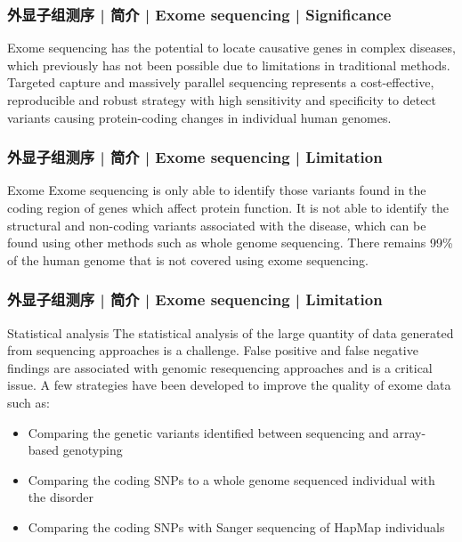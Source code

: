 \begin{frame}
  \frametitle{外显子组测序 | 简介 | Exome sequencing | Significance}
  Exome sequencing has the potential to locate causative genes in complex diseases, which previously has not been possible due to limitations in traditional methods.\\
  \vspace{1em}
  Targeted capture and massively parallel sequencing represents a cost-effective, reproducible and robust strategy with high sensitivity and specificity to detect variants causing protein-coding changes in individual human genomes.
\end{frame}

\begin{frame}
  \frametitle{外显子组测序 | 简介 | Exome sequencing | Limitation}
  \begin{block}{Exome}
 Exome sequencing is only able to identify those variants found in the coding region of genes which affect protein function. It is not able to identify the structural and non-coding variants associated with the disease, which can be found using other methods such as whole genome sequencing. There remains 99\% of the human genome that is not covered using exome sequencing.
  \end{block}
\end{frame}

\begin{frame}
  \frametitle{外显子组测序 | 简介 | Exome sequencing | Limitation}
  \begin{block}{Statistical analysis}
    The statistical analysis of the large quantity of data generated from sequencing approaches is a challenge. False positive and false negative findings are associated with genomic resequencing approaches and is a critical issue. A few strategies have been developed to improve the quality of exome data such as:
    \begin{itemize}
      \item Comparing the genetic variants identified between sequencing and array-based genotyping
      \item Comparing the coding SNPs to a whole genome sequenced individual with the disorder
      \item Comparing the coding SNPs with Sanger sequencing of HapMap individuals
    \end{itemize}
  \end{block}
\end{frame}

